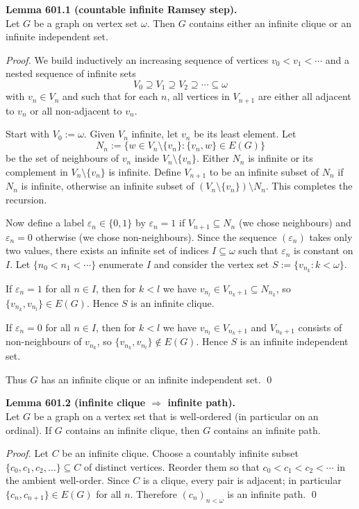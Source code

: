 \medskip
\noindent\textbf{Lemma 601.1 (countable infinite Ramsey step).}\\
Let $G$ be a graph on vertex set $\omega$. Then $G$ contains either an infinite clique or an infinite independent set.

\noindent\emph{Proof.}
We build inductively an increasing sequence of vertices $v_0<v_1<\cdots$ and a nested sequence of infinite sets
\[
V_0\supseteq V_1\supseteq V_2\supseteq\cdots\subseteq\omega
\]
with $v_n\in V_n$ and such that for each $n$, all vertices in $V_{n+1}$ are either all adjacent to $v_n$ or all non-adjacent to $v_n$.

Start with $V_0:=\omega$. Given $V_n$ infinite, let $v_n$ be its least element.
Let
\[
N_n := \{w\in V_n\setminus\{v_n\}: \{v_n,w\}\in E(G)\}
\]
be the set of neighbours of $v_n$ inside $V_n\setminus\{v_n\}$. Either $N_n$ is infinite or its complement in $V_n\setminus\{v_n\}$ is infinite.
Define $V_{n+1}$ to be an infinite subset of $N_n$ if $N_n$ is infinite, otherwise an infinite subset of $(V_n\setminus\{v_n\})\setminus N_n$.
This completes the recursion.

Now define a label $\varepsilon_n\in\{0,1\}$ by $\varepsilon_n=1$ if $V_{n+1}\subseteq N_n$ (we chose neighbours) and $\varepsilon_n=0$ otherwise (we chose non-neighbours).
Since the sequence $(\varepsilon_n)$ takes only two values, there exists an infinite set of indices $I\subseteq\omega$ such that $\varepsilon_n$ is constant on $I$.
Let $\{n_0<n_1<\cdots\}$ enumerate $I$ and consider the vertex set $S:=\{v_{n_k}:k<\omega\}$.

If $\varepsilon_n=1$ for all $n\in I$, then for $k<l$ we have $v_{n_l}\in V_{n_k+1}\subseteq N_{n_k}$, so $\{v_{n_k},v_{n_l}\}\in E(G)$. Hence $S$ is an infinite clique.

If $\varepsilon_n=0$ for all $n\in I$, then for $k<l$ we have $v_{n_l}\in V_{n_k+1}$ and $V_{n_k+1}$ consists of non-neighbours of $v_{n_k}$, so $\{v_{n_k},v_{n_l}\}\notin E(G)$. Hence $S$ is an infinite independent set.

Thus $G$ has an infinite clique or an infinite independent set. \qed

\medskip
\noindent\textbf{Lemma 601.2 (infinite clique $\Rightarrow$ infinite path).}\\
Let $G$ be a graph on a vertex set that is well-ordered (in particular on an ordinal). If $G$ contains an infinite clique, then $G$ contains an infinite path.

\noindent\emph{Proof.}
Let $C$ be an infinite clique. Choose a countably infinite subset $\{c_0,c_1,c_2,\dots\}\subseteq C$ of distinct vertices.
Reorder them so that $c_0<c_1<c_2<\cdots$ in the ambient well-order.
Since $C$ is a clique, every pair is adjacent; in particular $\{c_n,c_{n+1}\}\in E(G)$ for all $n$. Therefore $(c_n)_{n<\omega}$ is an infinite path. \qed

